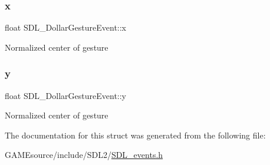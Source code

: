 \subsubsection{\texorpdfstring{x}{x}}
{\footnotesize\ttfamily float S\+D\+L\+\_\+\+Dollar\+Gesture\+Event\+::x}

Normalized center of gesture \mbox{\label{struct_s_d_l___dollar_gesture_event_a293b2303acc1cfc63c167c5525e6eab5}} 
\subsubsection{\texorpdfstring{y}{y}}
{\footnotesize\ttfamily float S\+D\+L\+\_\+\+Dollar\+Gesture\+Event\+::y}

Normalized center of gesture 

The documentation for this struct was generated from the following file\+:\begin{DoxyCompactItemize}
\item 
G\+A\+M\+Esource/include/\+S\+D\+L2/\mbox{\hyperlink{_s_d_l__events_8h}{S\+D\+L\+\_\+events.\+h}}\end{DoxyCompactItemize}
